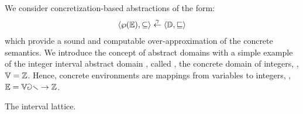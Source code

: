 We consider concretization-based abstractions of the form:
\begin{align*}
  \langle \wp(\mathbb{E}), \subseteq \rangle \overset{\gamma}{\leftarrow} \langle \mathbb{D}, \sqsubseteq \rangle
\end{align*}
which provide a sound and computable over-approximation of the concrete semantics.
  We introduce the concept of abstract domains with a simple example of the integer interval abstract domain , called \intervalname, \wrt{} the concrete domain of integers, \ie, $\mathbb{V} = \mathbb{Z}$.
  Hence, concrete environments are mappings from variables to integers, \ie, $\mathbb{E} = \mathbb{Var} \to \mathbb{Z}$.

\begin{marginfigure}
  \caption{The interval lattice.}
\end{marginfigure}


